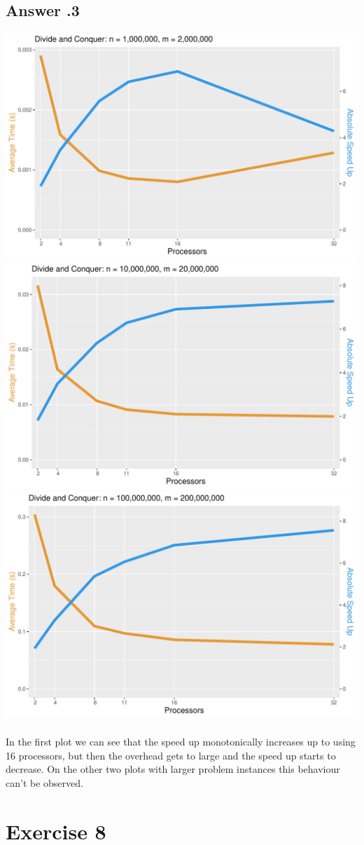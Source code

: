 \documentclass[a4paper,%
11pt,%
DIV=12,
headsepline,%
headings=normal,
]{scrartcl}
\newcounter{curex}
\newcommand{\exercise}[1]{\section*{Exercise #1}\setcounter{curex}{#1}}
\newcommand{\answer}[1]{\subsection*{Answer \arabic{curex}.#1}}
\begin{document}
\answer{3}
\includegraphics[scale=0.4,page=1]{../plots/merge_plot_Divide-and-Conquer_1000000_2000000}
\includegraphics[scale=0.4,page=1]{../plots/merge_plot_Divide-and-Conquer_10000000_20000000}
\includegraphics[scale=0.4,page=1]{../plots/merge_plot_Divide-and-Conquer_100000000_200000000}
\\
\\
In the first plot we can see that the speed up monotonically increases up to using 16 processors, but then the overhead gets to large and the speed up starts to decrease. On the other two plots with larger problem instances this behaviour can't be observed.
\exercise{8}
\end{document}
